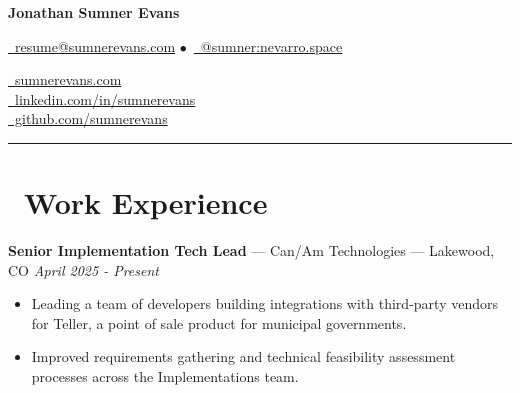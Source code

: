 \documentclass[10pt,letterpaper]{article}
\begin{document}
\begin{minipage}[b][][b]{0.5\linewidth}
    {\huge\textbf{Jonathan Sumner Evans}}

    \vspace{5pt}
    \href{mailto:resume@sumnerevans.com}{\faEnvelope\ resume@sumnerevans.com}
    $\bullet$\ \href{https://matrix.to/#/@sumner:nevarro.space}{\faMatrixOrg\ @sumner:nevarro.space}
\end{minipage}\hfill
\begin{minipage}[b][][b]{0.278\linewidth}
    \href{https://sumnerevans.com}{\faGlobe\ sumnerevans.com} \\
    \href{https://www.linkedin.com/in/sumnerevans}{\faLinkedin\ linkedin.com/in/sumnerevans} \\
    \href{https://github.com/sumnerevans}{\faGithub\ github.com/sumnerevans}
\end{minipage}
\rule{\textwidth}{0.5pt}

\section*{\faBriefcase\ Work Experience}
{\fontsize{11}{0}
\textbf{Senior Implementation Tech Lead} --- Can/Am Technologies --- Lakewood, CO}
\hfill \textit{April 2025 - Present}
\begin{itemize}
    \item Leading a team of developers building integrations with third-party
        vendors for Teller, a point of sale product for municipal governments.
    \item Improved requirements gathering and technical feasibility assessment
        processes across the Implementations team.
\end{itemize}
\end{document}
